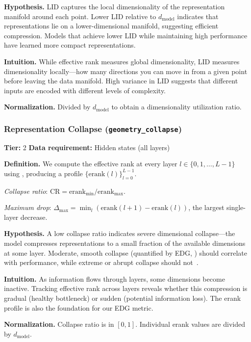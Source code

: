 \documentclass[preprint]{neurips_2025}
\begin{document}
\textbf{Hypothesis.}
LID captures the local dimensionality of the representation manifold around each point. Lower LID relative to $d_{\text{model}}$ indicates that representations lie on a lower-dimensional manifold, suggesting efficient compression. Models that achieve lower LID while maintaining high performance have learned more compact representations.

\textbf{Intuition.}
While effective rank measures global dimensionality, LID measures dimensionality locally---how many directions you can move in from a given point before leaving the data manifold. High variance in LID suggests that different inputs are encoded with different levels of complexity.

\textbf{Normalization.} Divided by $d_{\text{model}}$ to obtain a dimensionality utilization ratio.

\subsubsection{Representation Collapse (\texttt{geometry\_collapse})}
\label{app:collapse}

\textbf{Tier:} 2 \quad \textbf{Data requirement:} Hidden states (all layers)

\textbf{Definition.}
We compute the effective rank at every layer $l \in \{0, 1, \ldots, L-1\}$ using , producing a profile $\{\text{erank}(l)\}_{l=0}^{L-1}$.

\emph{Collapse ratio}: $\text{CR} = \text{erank}_{\min} / \text{erank}_{\max}$.

\emph{Maximum drop}: $\Delta_{\max} = \min_l (\text{erank}(l+1) - \text{erank}(l))$, the largest single-layer decrease.

\textbf{Hypothesis.}
A low collapse ratio indicates severe dimensional collapse---the model compresses representations to a small fraction of the available dimensions at some layer. Moderate, smooth collapse (quantified by EDG, ) should correlate with performance, while extreme or abrupt collapse should not~\citep{jing2021understanding}.

\textbf{Intuition.}
As information flows through layers, some dimensions become inactive. Tracking effective rank across layers reveals whether this compression is gradual (healthy bottleneck) or sudden (potential information loss). The erank profile is also the foundation for our EDG metric.

\textbf{Normalization.} Collapse ratio is in $[0, 1]$. Individual erank values are divided by $d_{\text{model}}$.
\end{document}
